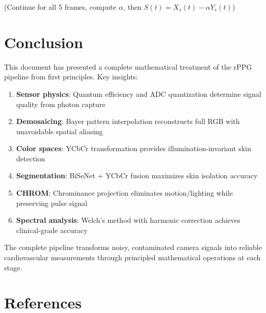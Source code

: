 \documentclass[11pt,a4paper]{article}
\begin{document}
(Continue for all 5 frames, compute $\alpha$, then $S(t) = X_s(t) - \alpha Y_s(t)$)

\section{Conclusion}

This document has presented a complete mathematical treatment of the rPPG pipeline from first principles. Key insights:

\begin{enumerate}
    \item \textbf{Sensor physics}: Quantum efficiency and ADC quantization determine signal quality from photon capture
    \item \textbf{Demosaicing}: Bayer pattern interpolation reconstructs full RGB with unavoidable spatial aliasing
    \item \textbf{Color spaces}: YCbCr transformation provides illumination-invariant skin detection
    \item \textbf{Segmentation}: BiSeNet + YCbCr fusion maximizes skin isolation accuracy
    \item \textbf{CHROM}: Chrominance projection eliminates motion/lighting while preserving pulse signal
    \item \textbf{Spectral analysis}: Welch's method with harmonic correction achieves clinical-grade accuracy
\end{enumerate}

The complete pipeline transforms noisy, contaminated camera signals into reliable cardiovascular measurements through principled mathematical operations at each stage.

\section*{References}
\end{document}
